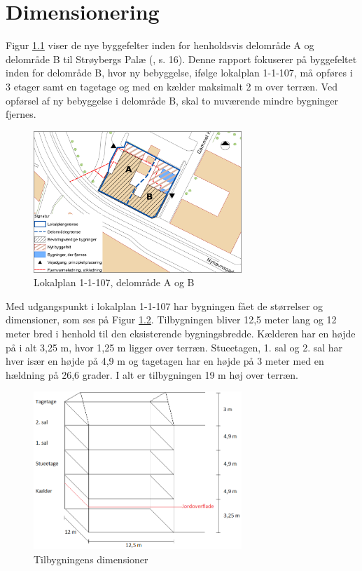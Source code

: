 \chapter{Dimensionering}

Figur \ref{fig:hej} viser de nye byggefelter inden for henholdsvis delområde A og delområde B til Strøybergs Palæ (\citep{lokalplan}, s. 16). Denne rapport fokuserer på byggefeltet inden for delområde B, hvor ny bebyggelse, ifølge lokalplan 1-1-107, må opføres i 3 etager samt en tagetage og med en kælder maksimalt 2 m over terræn. Ved opførsel af ny bebyggelse i delområde B, skal to nuværende mindre bygninger fjernes. 

\begin{figure}[htbp]
	\centering
	\includegraphics[width=0.7\textwidth]{billeder/signatur.png}
	\caption{Lokalplan 1-1-107, delområde A og B}
	\label{fig:hej}
\end{figure}

Med udgangspunkt i lokalplan 1-1-107 har bygningen fået de størrelser og dimensioner, som ses på Figur \ref{fig:farvel}.
\newline \indent{     }  Tilbygningen bliver 12,5 meter lang og 12 meter bred i henhold til den eksisterende bygningsbredde. Kælderen har en højde på i alt 3,25 m, hvor 1,25 m ligger over terræn. Stueetagen, 1. sal og 2. sal har hver især en højde på 4,9 m og tagetagen har en højde på 3 meter med en hældning på 26,6 grader. I alt er tilbygningen 19 m høj over terræn.

\begin{figure}[htbp]
	\centering
	\includegraphics[width=0.7\textwidth]{billeder/tilbygning2.png}
	\caption{Tilbygningens dimensioner}
	\label{fig:farvel}
\end{figure}

